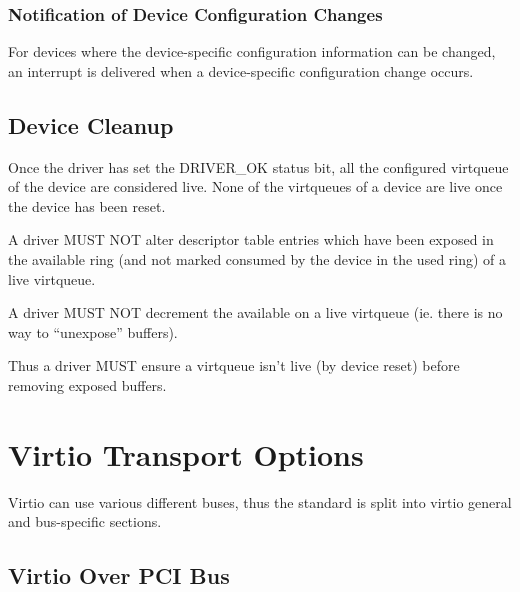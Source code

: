 \subsection{Notification of Device Configuration Changes}\label{sec:General Initialization And Device Operation / Device Operation / Notification of Device Configuration Changes}

For devices where the device-specific configuration information can be changed, an
interrupt is delivered when a device-specific configuration change occurs.

\section{Device Cleanup}\label{sec:General Initialization And Device Operation / Device Cleanup}

Once the driver has set the DRIVER_OK status bit, all the configured
virtqueue of the device are considered live.  None of the virtqueues
of a device are live once the device has been reset.


A driver MUST NOT alter descriptor table entries which have been
exposed in the available ring (and not marked consumed by the device
in the used ring) of a live virtqueue.

A driver MUST NOT decrement the available  on a live virtqueue (ie.
there is no way to ``unexpose'' buffers).

Thus a driver MUST ensure a virtqueue isn't live (by device reset) before removing exposed buffers.

\chapter{Virtio Transport Options}\label{sec:Virtio Transport Options}

Virtio can use various different buses, thus the standard is split
into virtio general and bus-specific sections.

\section{Virtio Over PCI Bus}\label{sec:Virtio Transport Options / Virtio Over PCI Bus}

